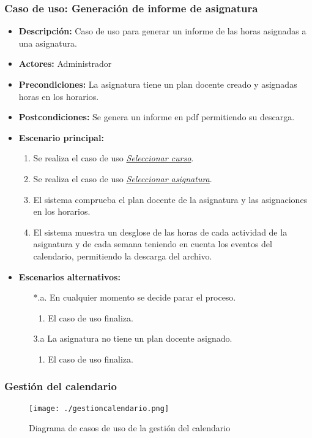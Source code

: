 \subsubsection*{Caso de uso: Generación de informe de asignatura}
\begin{itemize}
\item{\bf Descripción:} Caso de uso para generar un informe de las horas asignadas a una asignatura.
\item{\bf Actores:} Administrador
\item{\bf Precondiciones:} La asignatura tiene un plan docente creado y asignadas horas en los horarios.
\item{\bf Postcondiciones:} Se genera un informe en pdf permitiendo su descarga.
\item{\bf Escenario principal:}
	\begin{enumerate}
	\item Se realiza el caso de uso {\em \hyperref[select_curso]{Seleccionar curso}}.
	\item Se realiza el caso de uso {\em \hyperref[select_asignatura]{Seleccionar asignatura}}.
	\item El sistema comprueba el plan docente de la asignatura y las asignaciones en los horarios.
	\item El sistema muestra un desglose de las horas de cada actividad de la asignatura y de cada semana teniendo en cuenta los eventos del calendario, permitiendo la descarga del archivo.
	\end{enumerate}
\item{\bf Escenarios alternativos:}
	\begin{itemize}
		\item[*.a.] En cualquier momento se decide parar el proceso.
		\begin{enumerate}
			\item El caso de uso finaliza.
		\end{enumerate}
		\item[3.a] La asignatura no tiene un plan docente asignado.
		\begin{enumerate}
			\item El caso de uso finaliza.
		\end{enumerate}
	\end{itemize}
\end{itemize}

\subsubsection{Gestión del calendario}
\begin{figure}[H] 
  \label{gestion-calendario} 
	\begin{center}
    \texttt{[image: ./gestioncalendario.png]}
  \end{center}
\caption{Diagrama de casos de uso de la gestión del calendario}
\end{figure}


